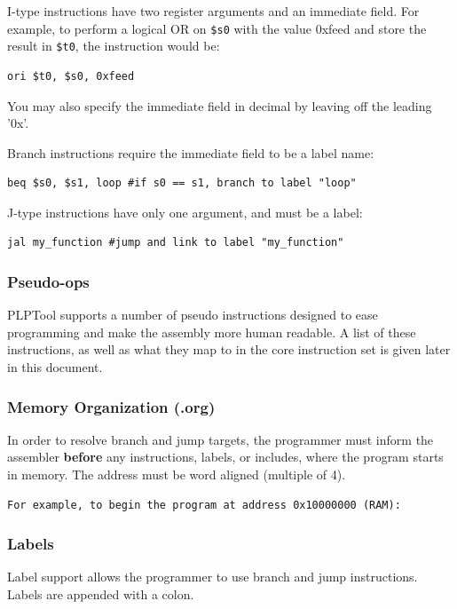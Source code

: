 \documentclass{article}
\begin{document}
I-type instructions have two register arguments and an immediate field. For example, to perform a logical OR on 
\verb+$s0+ with the value 0xfeed and store the result in 
\verb+$t0+, the instruction would be:

\begin{verbatim}
ori $t0, $s0, 0xfeed
\end{verbatim}

You may also specify the immediate field in decimal by leaving off the leading '0x'.

Branch instructions require the immediate field to be a label name:

\begin{verbatim}
beq $s0, $s1, loop #if s0 == s1, branch to label "loop"
\end{verbatim}

J-type instructions have only one argument, and must be a label:

\begin{verbatim}
jal my_function #jump and link to label "my_function"
\end{verbatim}

\subsubsection{Pseudo-ops}
PLPTool supports a number of pseudo instructions designed to ease programming and make the assembly more human readable. A list of these instructions, as well as what they map to in the core instruction set is given later in this document. 
\subsubsection{Memory Organization (.org)}
In order to resolve branch and jump targets, the programmer must inform the 
assembler \textbf{before} any instructions, labels, or includes, where the 
program starts in memory. The address must be word aligned (multiple of 4).

\begin{verbatim}
For example, to begin the program at address 0x10000000 (RAM): 
\end{verbatim}

\subsubsection{Labels}
Label support allows the programmer to use branch and jump instructions. Labels are appended with a colon.
\end{document}
